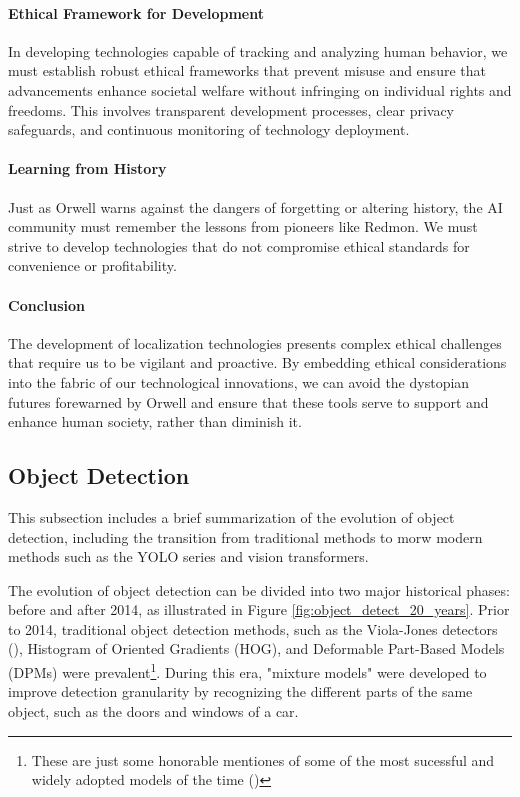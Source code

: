 \paragraph{Ethical Framework for Development}
In developing technologies capable of tracking and analyzing human behavior, we must establish robust ethical frameworks that prevent misuse and ensure that advancements enhance societal welfare without infringing on individual rights and freedoms. This involves transparent development processes, clear privacy safeguards, and continuous monitoring of technology deployment.

\paragraph{Learning from History}
Just as Orwell warns against the dangers of forgetting or altering history, the AI community must remember the lessons from pioneers like Redmon. We must strive to develop technologies that do not compromise ethical standards for convenience or profitability.

\paragraph{Conclusion}
The development of localization technologies presents complex ethical challenges that require us to be vigilant and proactive. By embedding ethical considerations into the fabric of our technological innovations, we can avoid the dystopian futures forewarned by Orwell and ensure that these tools serve to support and enhance human society, rather than diminish it.

\subsection{Object Detection}
This subsection includes a brief summarization of the evolution of object detection, including the transition from traditional methods to morw modern methods such as the YOLO series and vision transformers.

The evolution of object detection can be divided into two major historical phases: before and after 2014, as illustrated in Figure \ref{fig:object_detect_20_years}. Prior to 2014, traditional object detection methods, such as the Viola-Jones detectors (\cite{vi2001viola-jones-orig}), Histogram of Oriented Gradients (HOG), and Deformable Part-Based Models (DPMs) were prevalent\footnote{These are just some honorable mentiones of some of the most sucessful and widely adopted models of the time (\cite{li2012violajonessuccessful})}. During this era, "mixture models" were developed to improve detection granularity by recognizing the different parts of the same object, such as the doors and windows of a car.

